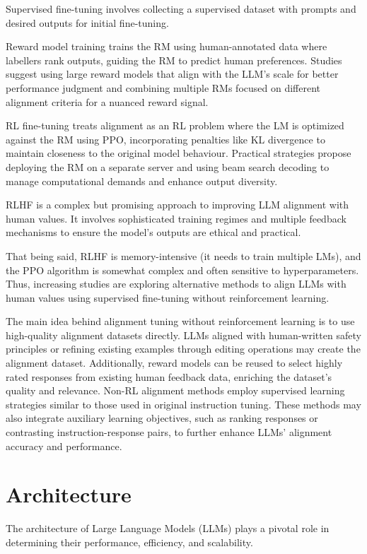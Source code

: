 Supervised fine-tuning involves collecting a supervised dataset with prompts and desired outputs for initial fine-tuning.

Reward model training trains the RM using human-annotated data where labellers rank outputs, guiding the RM to predict human preferences.
Studies suggest using large reward models that align with the LLM's scale for better performance judgment and combining multiple RMs focused on different alignment criteria for a nuanced reward signal.

RL fine-tuning treats alignment as an RL problem where the LM is optimized against the RM using PPO, incorporating penalties like KL divergence to maintain closeness to the original model behaviour.
Practical strategies propose deploying the RM on a separate server and using beam search decoding to manage computational demands and enhance output diversity.

RLHF is a complex but promising approach to improving LLM alignment with human values. It involves sophisticated training regimes and multiple feedback mechanisms to ensure the model's outputs are ethical and practical.

That being said, RLHF is memory-intensive (it needs to train multiple LMs), and the PPO algorithm is somewhat complex and often sensitive to hyperparameters.
Thus, increasing studies are exploring alternative methods to align LLMs with human values using supervised fine-tuning without reinforcement learning.

The main idea behind alignment tuning without reinforcement learning is to use high-quality alignment datasets directly.
LLMs aligned with human-written safety principles or refining existing examples through editing operations may create the alignment dataset.
Additionally, reward models can be reused to select highly rated responses from existing human feedback data, enriching the dataset's quality and relevance.
Non-RL alignment methods employ supervised learning strategies similar to those used in original instruction tuning.
These methods may also integrate auxiliary learning objectives, such as ranking responses or contrasting instruction-response pairs, to further enhance LLMs' alignment accuracy and performance.

\section{Architecture}
\label{sec:architecture}

The architecture of Large Language Models (LLMs) plays a pivotal role in determining their performance, efficiency, and scalability.

